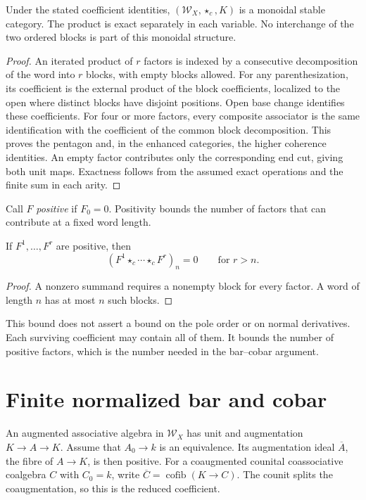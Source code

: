 \begin{proposition}
\label{prop:words-cut-monoidal}
Under the stated coefficient identities, \((\mathscr W_X,\star_c,K)\)
is a monoidal stable category.  The product is exact separately in
each variable.  No interchange of the two ordered blocks is part of
this monoidal structure.
\end{proposition}
\begin{proof}
An iterated product of \(r\) factors is indexed by a consecutive
decomposition of the word into \(r\) blocks, with empty blocks allowed.
For any parenthesization, its coefficient is the external product of
the block coefficients, localized to the open where distinct blocks
have disjoint positions.  Open base change identifies these
coefficients.  For four or more factors, every composite associator
is the same identification with the coefficient of the common block
decomposition.  This proves the pentagon and, in the enhanced
categories, the higher coherence identities.  An empty factor
contributes only the corresponding end cut, giving both unit maps.
Exactness follows from the assumed exact operations and the finite
sum in each arity.
\end{proof}

Call \(F\) \emph{positive} if \(F_0=0\).  Positivity bounds the
number of factors that can contribute at a fixed word length.

\begin{lemma}
\label{lem:words-arity-bound}
If \(F^1,\ldots,F^r\) are positive, then
\[
 (F^1\star_c\cdots\star_c F^r)_n=0
 \qquad\text{for }r>n.
\]
\end{lemma}
\begin{proof}
A nonzero summand requires a nonempty block for every factor.
A word of length \(n\) has at most \(n\) such blocks.
\end{proof}

This bound does not assert a bound on the pole order or on normal
derivatives.  Each surviving coefficient may contain all of them.
It bounds the number of positive factors, which is the number needed
in the bar--cobar argument.

\section{Finite normalized bar and cobar}

An augmented associative algebra in \(\mathscr W_X\) has unit and
augmentation \(K\to A\to K\).  Assume that \(A_0\to k\) is an
equivalence.  Its augmentation ideal \(\overline A\), the fibre of
\(A\to K\), is then positive.  For a coaugmented counital
coassociative coalgebra \(C\) with \(C_0=k\), write
\(\overline C=\operatorname{cofib}(K\to C)\).  The counit splits the
coaugmentation, so this is the reduced coefficient.

